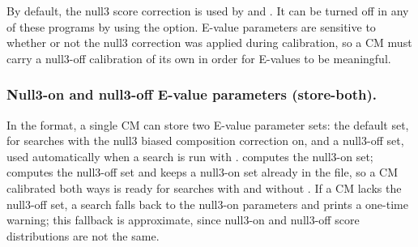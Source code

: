%

By default, the null3 score correction is used by  and . It can be turned off in any of these
programs by using the  option. E-value parameters are
sensitive to whether or not the null3 correction was applied during
calibration, so a CM must carry a null3-off calibration of its own in
order for  E-values to be meaningful.

\subsubsection{Null3-on and null3-off E-value parameters (store-both).}
\label{section:calibration-limitations}

In the  format, a single CM can store two E-value
parameter sets: the default set, for searches with the null3 biased
composition correction on, and a null3-off set, used automatically
when a search is run with . 
computes the null3-on set;  computes the
null3-off set and keeps a null3-on set already in the file, so a CM
calibrated both ways is ready for searches with and without
. If a CM lacks the null3-off set, a 
search falls back to the null3-on parameters and prints a one-time
warning; this fallback is approximate, since null3-on and null3-off
score distributions are not the same.

